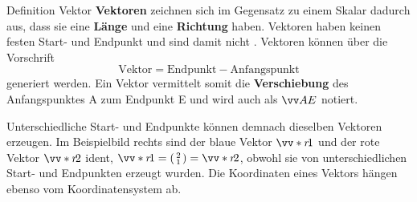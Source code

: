 \begin{rememberbox}[]{Definition Vektor}
    \textbf{Vektoren} zeichnen sich im Gegensatz zu einem Skalar dadurch aus, dass sie eine \textbf{Länge} und eine \textbf{Richtung} haben. Vektoren haben keinen festen Start- und Endpunkt und sind damit nicht . Vektoren können über die Vorschrift 
    \begin{equation}
        \mathrm{Vektor} = \mathrm{Endpunkt} - \mathrm{Anfangspunkt}
    \end{equation}
    generiert werden. Ein Vektor vermittelt somit die \textbf{Verschiebung} des Anfangspunktes A zum Endpunkt E und wird auch als $\ivec{AE}$ notiert. 
\end{rememberbox}
Unterschiedliche Start- und Endpunkte können demnach dieselben Vektoren erzeugen. Im Beispielbild rechts sind der blaue Vektor $\ivecS{r}{1}$ und der rote Vektor $\ivecS{r}{2}$ ident, $\ivecS{r}{1}=\begin{psmallmatrix} 2 \\ 1 \end{psmallmatrix} = \ivecS{r}{2}$, obwohl sie von unterschiedlichen Start- und Endpunkten erzeugt wurden. Die Koordinaten eines Vektors hängen ebenso vom Koordinatensystem ab.
